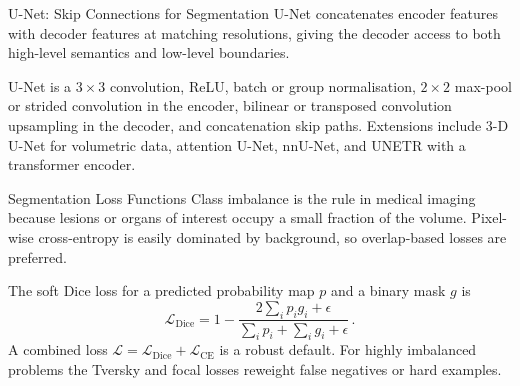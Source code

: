 \begin{frame}{U-Net: Skip Connections for Segmentation}
    U-Net concatenates encoder features with decoder features at matching resolutions, giving the decoder access to both high-level semantics and low-level boundaries.
    \begin{center}
    \end{center}
    U-Net is a $3{\times}3$ convolution, ReLU, batch or group normalisation, $2{\times}2$ max-pool or strided convolution in the encoder, bilinear or transposed convolution upsampling in the decoder, and concatenation skip paths. Extensions include 3-D U-Net for volumetric data, attention U-Net, nnU-Net, and UNETR with a transformer encoder.
\end{frame}

\begin{frame}{Segmentation Loss Functions}
    Class imbalance is the rule in medical imaging because lesions or organs of interest occupy a small fraction of the volume. Pixel-wise cross-entropy is easily dominated by background, so overlap-based losses are preferred.

    The soft Dice loss for a predicted probability map $p$ and a binary mask $g$ is
    \begin{equation*}
        \mathcal{L}_\mathrm{Dice} = 1 - \frac{2\sum_i p_i g_i + \epsilon}{\sum_i p_i + \sum_i g_i + \epsilon}\,.
    \end{equation*}
    A combined loss $\mathcal{L} = \mathcal{L}_\mathrm{Dice} + \mathcal{L}_\mathrm{CE}$ is a robust default. For highly imbalanced problems the Tversky and focal losses reweight false negatives or hard examples.
\end{frame}

